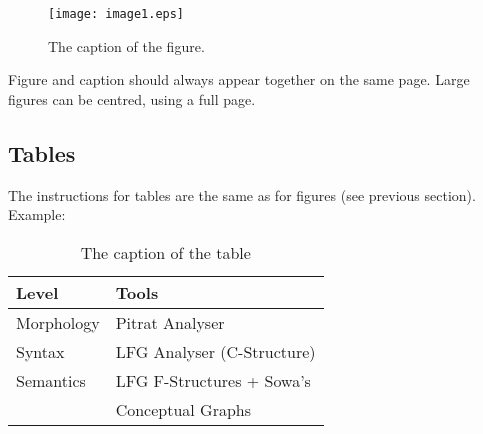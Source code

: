 \documentclass[10pt, a4paper]{article}
\begin{document}
\begin{figure}[h]
\begin{center}
\texttt{[image: image1.eps]} 
\caption{The caption of the figure.}
\label{fig.1}
\end{center}
\end{figure}

Figure and caption should always appear together on the same page. Large figures can be centred, using a full page.

\subsection{Tables}

The instructions for tables are the same as for figures (see previous section).
Example:
%
\begin{table}[h]
 \begin{center}
\begin{tabular}{|l|l|}

      \hline
      Level&Tools\\
      \hline\hline
      Morphology & Pitrat Analyser\\
      Syntax & LFG Analyser (C-Structure)\\
      Semantics & LFG F-Structures + Sowa's\\
      & Conceptual Graphs\\
      \hline

\end{tabular}
\caption{The caption of the table}
 \end{center}
\end{table}

%
%
%
%
%
\end{document}
